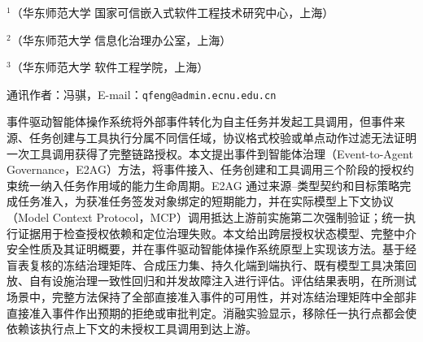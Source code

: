 \thispagestyle{josfirst}

\vspace{2pt}

\vspace{7pt}

\vspace{4pt}
\begingroup\fontsize{8pt}{12pt}\selectfont
\noindent$^{1}$（华东师范大学 国家可信嵌入式软件工程技术研究中心，上海）\par
\noindent$^{2}$（华东师范大学 信息化治理办公室，上海）\par
\noindent$^{3}$（华东师范大学 软件工程学院，上海）\par
\noindent 通讯作者：冯骐，E-mail：\texttt{qfeng@admin.ecnu.edu.cn}\par
\endgroup

\begin{joszhabstract}
事件驱动智能体操作系统将外部事件转化为自主任务并发起工具调用，但事件来源、任务创建与工具执行分属不同信任域，协议格式校验或单点动作过滤无法证明一次工具调用获得了完整链路授权。本文提出事件到智能体治理（Event-to-Agent Governance，E2AG）方法，将事件接入、任务创建和工具调用三个阶段的授权约束统一纳入任务作用域的能力生命周期。E2AG 通过来源--类型契约和目标策略完成任务准入，为获准任务签发对象绑定的短期能力，并在实际模型上下文协议（Model Context Protocol，MCP）调用抵达上游前实施第二次强制验证；统一执行证据用于检查授权依赖和定位治理失败。本文给出跨层授权状态模型、完整中介安全性质及其证明概要，并在事件驱动智能体操作系统原型上实现该方法。基于经盲表复核的冻结治理矩阵、合成压力集、持久化端到端执行、既有模型工具决策回放、自有设施治理一致性回归和并发故障注入进行评估。评估结果表明，在所测试场景中，完整方法保持了全部直接准入事件的可用性，并对冻结治理矩阵中全部非直接准入事件作出预期的拒绝或审批判定。消融实验显示，移除任一执行点都会使依赖该执行点上下文的未授权工具调用到达上游。
\end{joszhabstract}

